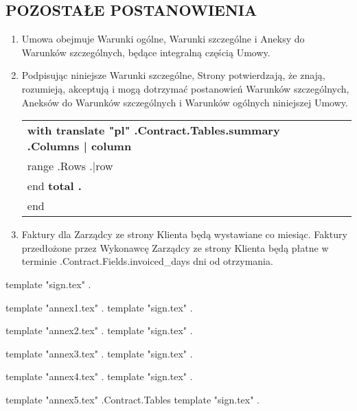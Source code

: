 \subsection{POZOSTAŁE POSTANOWIENIA}
\begin{enumerate}
	\item Umowa obejmuje Warunki ogólne, Warunki szczególne i Aneksy do Warunków szczególnych, będące integralną częścią Umowy.
	\item Podpisując niniejsze Warunki szczególne, Strony potwierdzają, że znają, rozumieją, akceptują i mogą dotrzymać postanowień Warunków szczególnych, Aneksów do Warunków szczególnych i Warunków ogólnych niniejszej Umowy.


\begin{center}
	\begin{tabu}{|X|X|X|X|}\tabucline{}\rowfont[c]\bfseries
	{{with translate "pl" .Contract.Tables.summary}} %
	{{.Columns | column}} \\\tabucline{}
	{{range .Rows}} %
	{{.|row}} \\\tabucline{}
	{{end}}
	\bfseries {{total .}} \\\tabucline{} %
	{{end}}
	\end{tabu}
\end{center}

\item Faktury dla Zarządcy ze strony Klienta będą wystawiane co miesiąc. Faktury przedłożone przez Wykonawcę Zarządcy ze strony Klienta będą płatne w terminie \iffalse input fields.invoiced_days value="{{.Contract.Fields.invoiced_days}}" type="number" \fi {{.Contract.Fields.invoiced_days}} dni od otrzymania.

\end{enumerate}

\vspace{2cm}
{{template "sign.tex" .}} %

{{template "annex1.tex" .}} %
{{template "sign.tex" .}} %

{{template "annex2.tex" .}} %
{{template "sign.tex" .}} %

{{template "annex3.tex" .}} %
{{template "sign.tex" .}} %

{{template "annex4.tex" .}} %
{{template "sign.tex" .}} %

{{template "annex5.tex" .Contract.Tables}} %
{{template "sign.tex" .}} %

